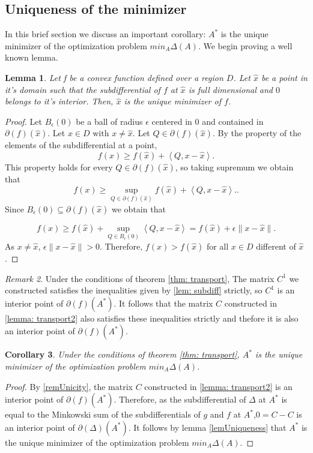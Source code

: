 \documentclass[12pt]{amsart}
\newtheorem{lemma}{Lemma}[section]
\newtheorem{cor}[lemma]{Corollary}
\theoremstyle{remark}
\newtheorem{remark}[lemma]{Remark}
\begin{document}
\subsection*{Uniqueness of the minimizer}
In this brief section we discuss an important corollary: $A^*$ is the unique minimizer of the optimization problem $min_A\Delta (A)$.
We begin proving a well known lemma. 

\begin{lemma}{\label{lemUniqueness}}
Let f be a convex function defined over a region $D$. Let $\hat{x}$ be a point in it's domain such that the subdifferential of $f$ at $\hat{x}$ is full dimensional and $0$ belongs to it's interior. Then, $\hat{x}$ is the unique minimizer of $f$.
\end{lemma}
\begin{proof}
Let $B_\epsilon(0)$ be a ball of radius $\epsilon$ centered in $0$ and contained in 
$\partial(f)(\hat{x})$. Let $x \in D \text{ with } x \neq \hat{x}$. Let $Q \in \partial(f)(\hat{x})$. By the property of the elements of the subdifferential at a point, 
\[
f(x) \geq f(\hat{x}) + \left \langle Q,x-\hat{x} \right \rangle.
\]
This property holds for every $Q \in \partial(f)(\hat{x})$, so taking supremum we obtain that
\[
f(x) \geq \sup_{Q \in \partial(f)(\hat{x})} f(\hat{x}) + \left \langle Q,x-\hat{x} \right \rangle..
\]
Since $B_\epsilon(0) \subseteq \partial(f)(\hat{x})$ we obtain that

\[
 f(x) \geq f(\hat{x})+\sup_{Q \in B_\epsilon(0)} \left \langle Q,x-\hat{x} \right \rangle = f(\hat{x})+ \epsilon\| x-\hat{x} \|.
\]
As $x \neq \hat{x}$, $\epsilon \| x-\hat{x} \|> 0$. Therefore, $f(x)>f(\hat{x})$ for all $x\in D$ different of $\hat{x}$.

\end{proof}

\begin{remark}{\label{remUnicity}}
Under the conditions of theorem \ref{thm: transport}, The matrix $C^1$ we constructed satisfies the inequalities given by \ref{lem: subdiff} strictly, so $C^1$ is an interior point of $\partial(f)(A^*)$. It follows that the matrix $C$ constructed in \ref{lemma: transport2} also satisfies these inequalities strictly and thefore it is also an interior point of $\partial(f)(A^*)$.
\end{remark}




\begin{cor}
Under the conditions of theorem \ref{thm: transport}, $A^*$ is the unique minimizer of the optimization problem $min_A\Delta (A)$.
\end{cor}
\begin{proof}
By \ref{remUnicity}, the matrix $C$ constructed in \ref{lemma: transport2} is an interior point of  $\partial(f)(A^*)$. Therefore, as the subdifferential of $\Delta$ at $A^*$ is equal to the Minkowski sum of the subdifferentials of $g$ and $f$ at $A^*$,$0=C-C$ is an interior point of $\partial(\Delta)(A^*)$. It follows by lemma \ref{lemUniqueness} that $A^*$ is the unique minimizer of the optimization problem  $min_A\Delta (A)$.


\end{proof}
\end{document}

